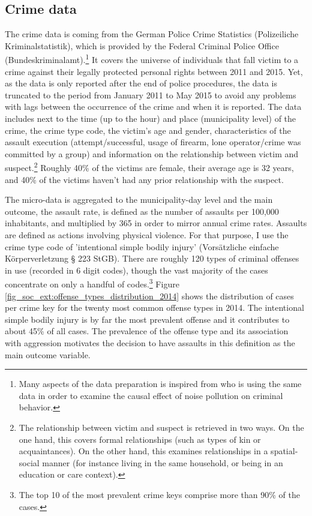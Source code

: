 \documentclass[11pt, a4paper]{article} %
\begin{document}
\subsection{Crime data}
The crime data is coming from the German Police Crime Statistics (Polizeiliche Kriminalstatistik), which is provided by the Federal Criminal Police Office (Bundeskriminalamt).\footnote{Many aspects of the data preparation is inspired from \cite{hener2019noise} who is using the same data in order to examine the causal effect of noise pollution on criminal behavior.} It covers the universe of individuals that fall victim to a crime against their legally protected personal rights between 2011 and 2015. Yet, as the data is only reported after the end of police procedures, the data is truncated to the period from January 2011 to May 2015 to avoid any problems with lags between the occurrence of the crime and when it is reported. The data includes next to the time (up to the hour) and place (municipality level) of the crime, the crime type code, the victim's age and gender, characteristics of the assault execution (attempt/successful, usage of firearm, lone operator/crime was committed by a group) and information on the relationship between victim and suspect.\footnote{The relationship between victim and suspect is retrieved in two ways. On the one hand, this covers formal relationships (such as types of kin or acquaintances). On the other hand, this examines relationships in a spatial-social manner (for instance living in the same household, or being in an education or care context).} Roughly 40\% of the victims are female, their average age is 32 years, and 40\% of the victims haven't had any prior relationship with the suspect.\newline

The micro-data is aggregated to the municipality-day level and the main outcome, the assault rate, is defined as the number of assaults per 100,000 inhabitants, and multiplied by 365 in order to mirror annual crime rates. Assaults are defined as actions involving physical violence. For that purpose, I use the crime type code of 'intentional simple bodily injury' (Vorsätzliche einfache Körperverletzung § 223 StGB). There are roughly 120 types of criminal offenses in use (recorded in 6 digit codes), though the vast majority of the cases concentrate on only a handful of codes.\footnote{The top 10 of the most prevalent crime keys comprise more than 90\% of the cases.} Figure \ref{fig_soc_ext:offense_types_distribution_2014} shows the distribution of cases per crime key for the twenty most common offense types in 2014. The intentional simple bodily injury is by far the most prevalent offense and it contributes to about 45\% of all cases. The prevalence of the offense type and its association with aggression motivates the decision to have assaults in this definition as the main outcome variable.\newline
\end{document}
